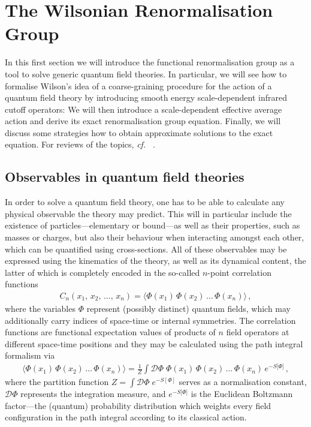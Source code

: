 \documentclass[11pt]{book}
\newcommand\cf{\textit{cf.}\ }
\numberwithin{equation}{chapter}
\begin{document}
\section{The Wilsonian Renormalisation Group}

In this first section we will introduce the functional renormalisation group as
a tool to solve generic quantum field theories. In particular, we will see how to
formalise Wilson's idea of a coarse-graining procedure for the action
of a quantum field theory by introducing smooth energy scale-dependent
infrared cutoff operators: We will then introduce a scale-dependent
effective average action and derive its exact renormalisation group equation.
Finally, we will discuss some strategies how to obtain approximate solutions
to the exact equation. For reviews of the topics, \cf
\cite{
  Berges:2000ew,
  Aoki:2000wm,
  Pawlowski:2005xe,
  Gies:2006wv,
  Rosten:2010vm
}.


\subsection{Observables in quantum field theories}

In order to solve a quantum field theory, one has to be
able to calculate any physical observable the theory may predict.
This will in particular include the existence of particles---elementary
or bound---as well as their properties, such as masses or charges,
but also their behaviour when interacting amongst each other, which
can be quantified using cross-sections.
All of these observables may be expressed using the kinematics
of the theory, as well as its dynamical content, the latter of
which is completely encoded in the so-called $n$-point correlation
functions
\begin{align}
  C_n(x_1, \, x_2,\, \dots, \, x_n) =
  \big\langle  \Phi(x_1) \, \Phi(x_2) \, \dots \, \Phi(x_n) \big\rangle \,,
\end{align}
where the variables $\Phi$ represent (possibly distinct) quantum fields,
which may additionally carry indices of space-time or internal symmetries.
The correlation functions are functional expectation values of products of $n$ field
operators at different space-time positions and they may be
calculated using the path integral formalism via
\begin{align}
  \big\langle  \Phi(x_1) \, \Phi(x_2) \, \dots \, \Phi(x_n) \big\rangle
  = \frac{1}{Z} \int \mathcal D \Phi \;
  \Phi(x_1) \, \Phi(x_2) \, \dots \, \Phi(x_n) \, e^{-S \lbrack \Phi \rbrack } \,,
  \label{eq:expvalue}
\end{align}
where the partition function $Z = \int \mathcal D \Phi \; e^{-S[\Phi]}$ serves as a
normalisation constant, $\mathcal D \Phi$ represents the integration measure,
and $e^{-S \lbrack \Phi \rbrack}$
is the Euclidean Boltzmann factor---the (quantum) probability distribution
which weights every field configuration in the path integral
according to its classical action.
\end{document}
